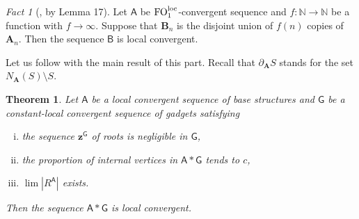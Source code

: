 \documentclass[11pt]{article}
\theoremstyle{plain}
\newtheorem{theorem}{Theorem}[section]
\theoremstyle{definition}
\theoremstyle{remark}
\newtheorem{fact}{Fact}
\newcommand{\N}{\mathbb{N}}
\DeclareMathOperator\FO{FO}
\newcommand{\FOloc}[1]{\FO_{#1}^\textnormal{loc}}
\newcommand{\str}[1]{\mathbf{#1}}
\newcommand{\strseq}[1]{{\boldsymbol{\mathsf{#1}}}}
\newcommand{\tpl}[1]{{\bm{#1}}}
\begin{document}
\begin{fact}[\cite{modeling_limits_in_hereditary_classes}, by Lemma 17]\label{fact:union_of_infinitely_many_copies}
    Let $\strseq{A}$ be $\FOloc{1}$-convergent sequence and $f: \N \to \N$ be a function with $f \to \infty$.
    Suppose that $\str{B}_n$ is the disjoint union of $f(n)$ copies of $\str{A}_n$.
    Then the sequence $\strseq{B}$ is local convergent.
\end{fact}

Let us follow with the main result of this part.
Recall that $\partial_\str{A} S$ stands for the set $N_\str{A}(S) \setminus S$.

\begin{theorem}\label{thm:fo_small_roots}
    Let $\strseq{A}$ be a local convergent sequence of base structures and $\strseq{G}$ be a constant-local convergent sequence of gadgets satisfying
    \begin{enumerate}[(i)]
        \item the sequence $\tpl{z}^\strseq{G}$ of roots is negligible in $\strseq{G}$,
        \item the proportion of internal vertices in $\strseq{A}*\strseq{G}$ tends to $c$,
        \item $\lim |R^\strseq{A}|$ exists.
    \end{enumerate}
    Then the sequence $\strseq{A}*\strseq{G}$ is local convergent.
\end{theorem}
\end{document}
